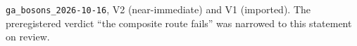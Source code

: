 \texttt{ga\_bosons\_2026-10-16}, V2 (near-immediate) and V1 (imported). The preregistered verdict ``the composite route fails'' was narrowed to this statement on review.
